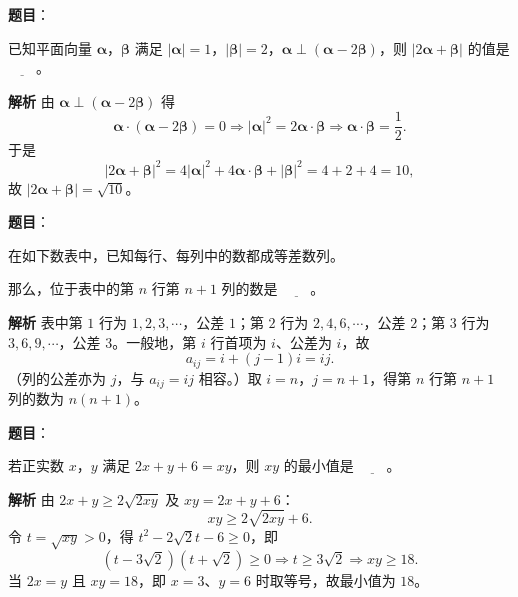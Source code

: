 \begin{answer}

\textbf{题目}：

已知平面向量 $\boldsymbol\alpha$，$\boldsymbol\beta$ 满足 $|\boldsymbol\alpha|=1$，$|\boldsymbol\beta|=2$，$\boldsymbol\alpha\perp(\boldsymbol\alpha-2\boldsymbol\beta)$，则 $|2\boldsymbol\alpha+\boldsymbol\beta|$ 的值是 $\underline{\qquad}$。

\textbf{解析}
由 $\boldsymbol\alpha\perp(\boldsymbol\alpha-2\boldsymbol\beta)$ 得
\nopagebreak[4]
\[\boldsymbol\alpha\cdot(\boldsymbol\alpha-2\boldsymbol\beta)=0\Rightarrow|\boldsymbol\alpha|^2=2\boldsymbol\alpha\cdot\boldsymbol\beta\Rightarrow\boldsymbol\alpha\cdot\boldsymbol\beta=\frac12.\]
于是
\nopagebreak[4]
\[|2\boldsymbol\alpha+\boldsymbol\beta|^2=4|\boldsymbol\alpha|^2+4\boldsymbol\alpha\cdot\boldsymbol\beta+|\boldsymbol\beta|^2
=4+2+4=10,\]
故 $|2\boldsymbol\alpha+\boldsymbol\beta|=\sqrt{10}$。


\end{answer}
\begin{answer}

\textbf{题目}：

在如下数表中，已知每行、每列中的数都成等差数列。
\nopagebreak[4]
\begin{center}\end{center}
\nopagebreak[4]
那么，位于表中的第 $n$ 行第 $n+1$ 列的数是 $\underline{\qquad}$。

\textbf{解析}
表中第 $1$ 行为 $1,2,3,\cdots$，公差 $1$；第 $2$ 行为 $2,4,6,\cdots$，公差 $2$；第 $3$ 行为 $3,6,9,\cdots$，公差 $3$。一般地，第 $i$ 行首项为 $i$、公差为 $i$，故
\nopagebreak[4]
\[a_{ij}=i+(j-1)i=ij.\]
（列的公差亦为 $j$，与 $a_{ij}=ij$ 相容。）取 $i=n$，$j=n+1$，得第 $n$ 行第 $n+1$ 列的数为 $n(n+1)$。


\end{answer}
\begin{answer}

\textbf{题目}：

若正实数 $x$，$y$ 满足 $2x+y+6=xy$，则 $xy$ 的最小值是 $\underline{\qquad}$。

\textbf{解析}
由 $2x+y\geqslant2\sqrt{2xy}$ 及 $xy=2x+y+6$：
\nopagebreak[4]
\[xy\geqslant2\sqrt{2xy}+6.\]
令 $t=\sqrt{xy}>0$，得 $t^2-2\sqrt2t-6\geqslant0$，即
\nopagebreak[4]
\[\left(t-3\sqrt2\right)\left(t+\sqrt2\right)\geqslant0\Rightarrow t\geqslant3\sqrt2\Rightarrow xy\geqslant18.\]
当 $2x=y$ 且 $xy=18$，即 $x=3$、$y=6$ 时取等号，故最小值为 $18$。


\end{answer}
